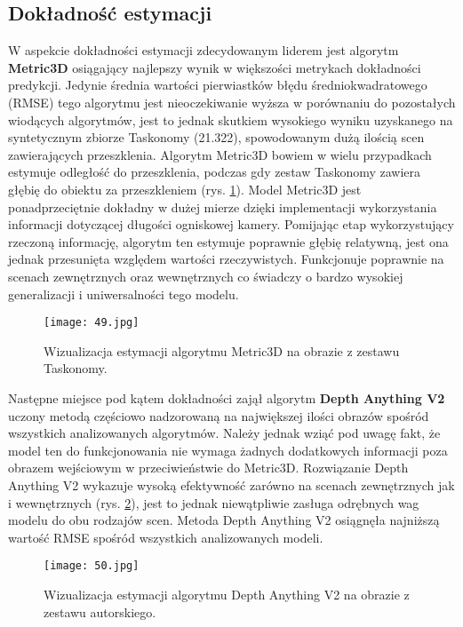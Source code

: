 \subsection{Dokładność estymacji}
W aspekcie dokładności estymacji zdecydowanym liderem jest algorytm \textbf{Metric3D} osiągający najlepszy wynik w większości metrykach dokładności predykcji. Jedynie średnia wartości pierwiastków błędu średniokwadratowego (RMSE) tego algorytmu jest nieoczekiwanie wyższa w porównaniu do pozostałych wiodących algorytmów, jest to jednak skutkiem wysokiego wyniku uzyskanego na syntetycznym zbiorze Taskonomy (21.322), spowodowanym dużą ilością scen zawierających przeszklenia. Algorytm Metric3D bowiem w wielu przypadkach estymuje odległość do przeszklenia, podczas gdy zestaw Taskonomy zawiera głębię do obiektu za przeszkleniem (rys. \ref{fig:metric3d-taskonomy}). Model Metric3D jest ponadprzeciętnie dokładny w dużej mierze dzięki implementacji wykorzystania informacji dotyczącej długości ogniskowej kamery. Pomijając etap wykorzystujący rzeczoną informację, algorytm ten estymuje poprawnie głębię relatywną, jest ona jednak przesunięta względem wartości rzeczywistych. Funkcjonuje poprawnie na scenach zewnętrznych oraz wewnętrznych co świadczy o bardzo wysokiej generalizacji i uniwersalności tego modelu.
\begin{figure}[H]
    \centering
    \texttt{[image: 49.jpg]}
    \caption{Wizualizacja estymacji algorytmu Metric3D na obrazie z zestawu Taskonomy.}
    \label{fig:metric3d-taskonomy}
\end{figure}

Następne miejsce pod kątem dokładności zajął algorytm \textbf{Depth Anything V2} uczony metodą częściowo nadzorowaną na największej ilości obrazów spośród wszystkich analizowanych algorytmów. Należy jednak wziąć pod uwagę fakt, że model ten do funkcjonowania nie wymaga żadnych dodatkowych informacji poza obrazem wejściowym w przeciwieństwie do Metric3D. Rozwiązanie Depth Anything V2 wykazuje wysoką efektywność zarówno na scenach zewnętrznych jak i wewnętrznych (rys. \ref{fig:depthanything-stray}), jest to jednak niewątpliwie zasługa odrębnych wag modelu do obu rodzajów scen. Metoda Depth Anything V2 osiągnęła najniższą wartość RMSE spośród wszystkich analizowanych modeli.
\begin{figure}[H]
    \centering
    \texttt{[image: 50.jpg]}
    \caption{Wizualizacja estymacji algorytmu Depth Anything V2 na obrazie z zestawu autorskiego.}
    \label{fig:depthanything-stray}
\end{figure}

